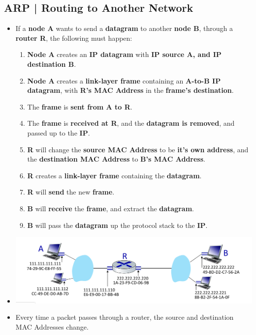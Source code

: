 \documentclass{article}
\begin{document}
    \subsection*{ARP | Routing to Another Network}
    \begin{itemize}
        \item If a \textbf{node A} wants to send a \textbf{datagram} to another \textbf{node B}, through a \textbf{router R}, the following must happen:
        \begin{enumerate}
            \item \textbf{Node A} creates an \textbf{IP datagram} with \textbf{IP source A, and IP destination B}.
            \item \textbf{Node A} creates a \textbf{link-layer frame} containing an \textbf{A-to-B IP datagram}, with \textbf{R's MAC Address} in the \textbf{frame's destination}.
            \item The \textbf{frame} is \textbf{sent from A to R}.
            \item The \textbf{frame} is \textbf{received at R}, and the \textbf{datagram is removed}, and passed up to the \textbf{IP}.
            \item \textbf{R} will change the \textbf{source MAC Address} to be \textbf{it's own address}, and the \textbf{destination MAC Address} to \textbf{B's MAC Address}.
            \item \textbf{R} creates a \textbf{link-layer frame} containing the \textbf{datagram}.
            \item \textbf{R} will \textbf{send} the new \textbf{frame}.
            \item \textbf{B} will \textbf{receive} the \textbf{frame}, and extract the \textbf{datagram}.
            \item \textbf{B} will pass the \textbf{datagram} up the protocol stack to the \textbf{IP}.
        \end{enumerate}
        \item[] \includegraphics[width=\textwidth - 25pt]{images/MAC-Routing-Example.png}
        \item Every time a packet passes through a router, the source and destination MAC Addresses change.
    \end{itemize}
\end{document}
